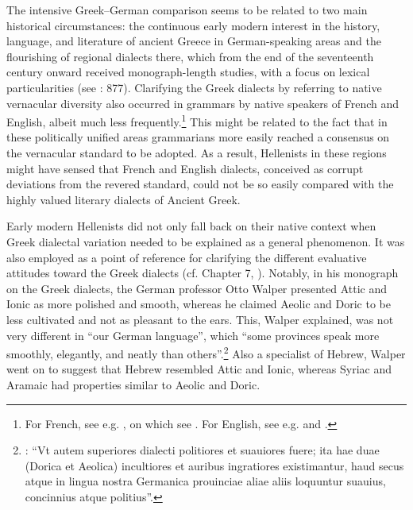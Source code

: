 The intensive Greek–German comparison seems to be related to two main historical circumstances: the continuous early modern interest in the history, language, and literature of ancient Greece in German-speaking areas and the flourishing of regional dialects there, which from the end of the seventeenth century onward received monograph-length studies, with a focus on lexical particularities (see \citealt{Hasler2009}: 877). Clarifying the Greek dialects by referring to native vernacular diversity also occurred in grammars by native speakers of French and English, albeit much less frequently.\footnote{For French, see e.g. \citet[11--12]{Antesignanus1554}, on which see \citet{VanRooy2016c}. For English, see e.g. \citet[191--192]{Milner1734} and \citet[121]{Holmes1735}.} This might be related to the fact that in these politically unified areas grammarians more easily reached a consensus on the vernacular standard to be adopted. As a result, Hellenists in these regions might have sensed that French and English dialects, conceived as corrupt deviations from the revered standard, could not be so easily compared with the highly valued literary dialects of Ancient Greek.

Early modern Hellenists did not only fall back on their native context when Greek dialectal variation needed to be explained as a general phenomenon. It was also employed as a point of reference for clarifying the different evaluative attitudes toward the Greek dialects (cf. Chapter 7, ). Notably, in his monograph on the Greek dialects, the German professor Otto Walper presented Attic and Ionic as more polished and smooth, whereas he claimed Aeolic and Doric to be less cultivated and not as pleasant to the ears. This, Walper explained, was not very different in “our German language”, which “some provinces speak more smoothly, elegantly, and neatly than others”.\footnote{\citet[61]{Walper1589}: “Vt autem superiores dialecti politiores et suauiores fuere; ita hae duae (Dorica et Aeolica) incultiores et auribus ingratiores existimantur, haud secus atque in lingua nostra Germanica prouinciae aliae aliis loquuntur suauius, concinnius atque politius”.} Also a specialist of Hebrew, Walper went on to suggest that Hebrew resembled Attic and Ionic, whereas Syriac and Aramaic had properties similar to Aeolic and Doric.

